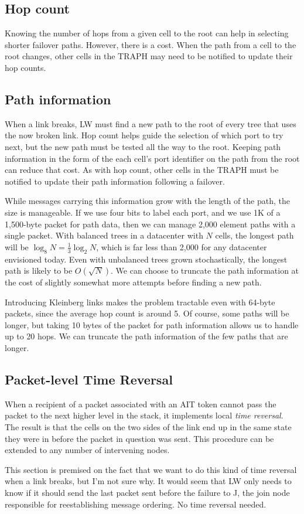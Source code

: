 \documentclass[../../../OAE-SPEC-MAIN.tex]{subfiles}
\begin{document}
 
\subsection{Hop count}

Knowing the number of hops from a given cell to the root can help in selecting shorter failover paths.  However, there is a cost.  When the path from a cell to the root changes, other cells in the TRAPH may need to be notified to update their hop counts.

\subsection{Path information}

When a link breaks, LW must find a new path to the root of every tree that uses the now broken link.  Hop count helps guide the selection of which port to try next, but the new path must be tested all the way to the root.  Keeping path information in the form of the each cell's port identifier on the path from the root can reduce that cost.  As with hop count, other cells in the TRAPH must be notified to update their path information following a failover.

While messages carrying this information grow with the length of the path, the size is manageable.  If we use four bits to label each port, and we use 1K of a 1,500-byte packet for path data, then we can manage 2,000 element paths with a single packet.  With balanced trees in a datacenter with $N$ cells, the longest path will be $\log_8{N} = \frac{1}{3}\log_2{N}$, which is far less than 2,000 for any datacenter envisioned today.  Even with unbalanced trees grown stochastically, the longest path is likely to be $O(\sqrt{N})$.  We can choose to truncate the path information at the cost of slightly somewhat more attempts before finding a new path.

Introducing Kleinberg links makes the problem tractable even with 64-byte packets, since the average hop count is around 5.  Of course, some paths will be longer, but taking 10 bytes of the packet for path information allows us to handle up to 20 hops.  We can truncate the path information of the few paths that are longer.

\subsection{Packet-level Time Reversal}

When a recipient of a packet associated with an AIT token cannot pass the packet to the next higher level in the stack, it implements local \emph{time reversal}.  The result is that the cells on the two sides of the link end up in the same state they were in before the packet in question was sent.  This procedure can be extended to any number of intervening nodes.

This section is premised on the fact that we want to do this kind of time reversal when a link breaks, but I'm not sure why.  It would seem that LW only needs to know if it should send the last packet sent before the failure to J, the join node responsible for reestablishing message ordering.  No time reversal needed.
\end{document}
